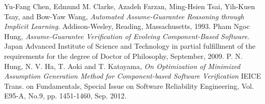 \documentclass[a4paper,13pt,oneside,openany]{book}
\begin{document}
\begin{thebibliography}{9}
	Yu-Fang Chen, Edmund M. Clarke, Azadeh Farzan, Ming-Hsien Tsai,
	Yih-Kuen Tsay, and Bow-Yaw Wang, \textit{Automated Assume-Guarantee Reasoning
		through Implicit Learning}. 
	Addison-Wesley, Reading, Massachusetts, 1993.
	Pham Ngoc Hung, \textit{Assume-Guarantee Verification of Evolving Component-Based Software}.
	Japan Advanced Institute of Science and Technology in partial fulfillment of the requirements for the degree of Doctor of Philosophy, September, 2009.
	P. N. Hung, N. V.  Ha, T. Aoki and T. Katayama, \textit{On Optimization of Minimized Assumption Generation Method for Component-based Software Verification}
	IEICE Trans. on Fundamentals, Special Issue on Software Reliability Engineering, Vol. E95-A, No.9, pp. 1451-1460, Sep. 2012.
\end{thebibliography}
\end{document}
